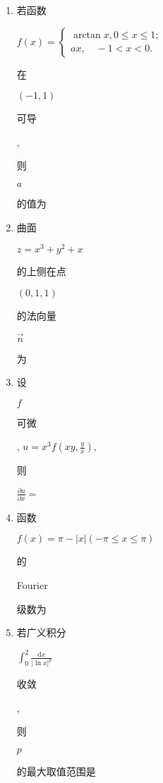 \documentclass[10pt]{article}
\begin{document}
\begin{enumerate}
  \item \begin{CJK}{UTF8}{mj}若函数\end{CJK} $f(x)=\left\{\begin{array}{l}\arctan x, 0 \leqslant x \leqslant 1 ; \\ a x, \quad-1<x<0 .\end{array}\right.$ \begin{CJK}{UTF8}{mj}在\end{CJK} $(-1,1)$ \begin{CJK}{UTF8}{mj}可导\end{CJK}, \begin{CJK}{UTF8}{mj}则\end{CJK} $a$ \begin{CJK}{UTF8}{mj}的值为\end{CJK}

  \item \begin{CJK}{UTF8}{mj}曲面\end{CJK} $z=x^{3}+y^{2}+x$ \begin{CJK}{UTF8}{mj}的上侧在点\end{CJK} $(0,1,1)$ \begin{CJK}{UTF8}{mj}的法向量\end{CJK} $\vec{n}$ \begin{CJK}{UTF8}{mj}为\end{CJK}

  \item \begin{CJK}{UTF8}{mj}设\end{CJK} $f$ \begin{CJK}{UTF8}{mj}可微\end{CJK}, $u=x^{3} f\left(x y, \frac{y}{x}\right)$, \begin{CJK}{UTF8}{mj}则\end{CJK} $\frac{\partial u}{\partial x}=$

  \item \begin{CJK}{UTF8}{mj}函数\end{CJK} $f(x)=\pi-|x|(-\pi \leqslant x \leqslant \pi)$ \begin{CJK}{UTF8}{mj}的\end{CJK} Fourier \begin{CJK}{UTF8}{mj}级数为\end{CJK}

  \item \begin{CJK}{UTF8}{mj}若广义积分\end{CJK} $\int_{0}^{2} \frac{\mathrm{d} x}{|\ln x|^{p}}$ \begin{CJK}{UTF8}{mj}收敛\end{CJK}, \begin{CJK}{UTF8}{mj}则\end{CJK} $p$ \begin{CJK}{UTF8}{mj}的最大取值范围是\end{CJK}

\end{enumerate}
\end{document}
